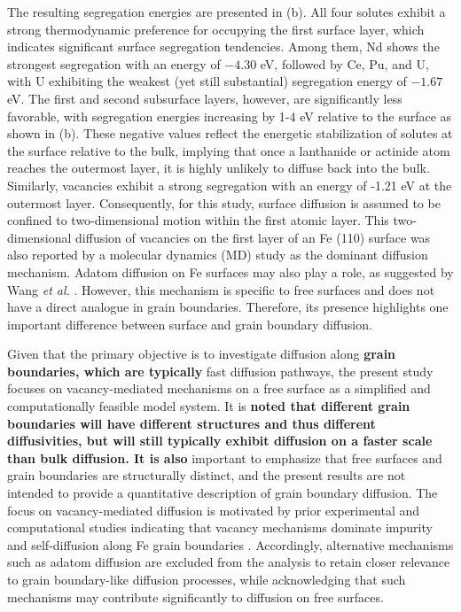 \documentclass[preprint,12pt]{elsarticle}
\providecommand{\DIFaddtex}[1]{{\bf #1}} %
\providecommand{\DIFaddbegin}{\protect\color{blue}} %
\providecommand{\DIFaddend}{\protect\color{black}} %
\providecommand{\DIFadd}[1]{\texorpdfstring{\DIFaddtex{#1}}{#1}} %
\newcommand{\DIFaddincludegraphics}[2][]{{\color{blue}\fbox{\DIFOincludegraphics[#1]{#2}}}} %
\DeclareRobustCommand{\DIFaddbegin}{\DIFOaddbegin \let\includegraphics\DIFaddincludegraphics} %
\DeclareRobustCommand{\DIFaddend}{\DIFOaddend \let\includegraphics\DIFOincludegraphics} %
\begin{document}
The resulting segregation energies are presented in (b). All four solutes exhibit a strong thermodynamic preference for occupying the first surface layer, which indicates significant surface segregation tendencies. Among them, Nd shows the strongest segregation with an energy of \( -4.30 \) eV, followed by Ce, Pu, and U, with U exhibiting the weakest (yet still substantial) segregation energy of \( -1.67 \) eV.
The first and second subsurface layers, however, are significantly less favorable, with segregation energies increasing by 1-4 eV relative to the surface as shown in (b). These negative values reflect the energetic stabilization of solutes at the surface relative to the bulk, implying that once a lanthanide or actinide atom reaches the outermost layer, it is highly unlikely to diffuse back into the bulk. Similarly, vacancies exhibit a strong segregation with an energy of -1.21 eV at the outermost layer. Consequently, for this study, surface diffusion is assumed to be confined to two-dimensional motion within the first atomic layer. This two-dimensional diffusion of vacancies on the first layer of an Fe (110) surface was also reported by a molecular dynamics (MD) study \cite{wang2010single} as the dominant diffusion mechanism. Adatom diffusion on Fe surfaces may also play a role, as suggested by Wang \textit{et al.} \cite{wang2012molecular}. However, this mechanism is specific to free surfaces and does not have a direct analogue in grain boundaries. Therefore, its presence highlights one important difference between surface and grain boundary diffusion.

Given that the primary objective is to investigate diffusion along \DIFaddbegin \DIFadd{grain boundaries, which are typically }\DIFaddend fast diffusion pathways, the present study focuses on vacancy-mediated mechanisms on a free surface as a simplified and computationally feasible model system. It is \DIFaddbegin \DIFadd{noted that different grain boundaries will have different structures and thus different diffusivities, but will still typically exhibit diffusion on a faster scale than bulk diffusion. It is also }\DIFaddend important to emphasize that free surfaces and grain boundaries are structurally distinct, and the present results are not intended to provide a quantitative description of grain boundary diffusion. The focus on vacancy-mediated diffusion is motivated by prior experimental and computational studies indicating that vacancy mechanisms dominate impurity and self-diffusion along Fe grain boundaries \cite{balluffi1982grain,peterson1983grain, klotsman1990impurity, kwok1981, inoue2007grain}. Accordingly, alternative mechanisms such as adatom diffusion are excluded from the analysis to retain closer relevance to grain boundary-like diffusion processes, while acknowledging that such mechanisms may contribute significantly to diffusion on free surfaces.
\end{document}

